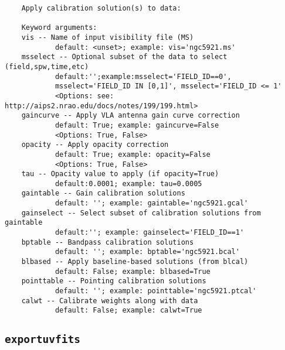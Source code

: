 \small
\begin{verbatim}
    Apply calibration solution(s) to data:
    
    Keyword arguments:
    vis -- Name of input visibility file (MS)
            default: <unset>; example: vis='ngc5921.ms'
    msselect -- Optional subset of the data to select (field,spw,time,etc)
            default:'';example:msselect='FIELD_ID==0', 
            msselect='FIELD_ID IN [0,1]', msselect='FIELD_ID <= 1'
            <Options: see: http://aips2.nrao.edu/docs/notes/199/199.html>
    gaincurve -- Apply VLA antenna gain curve correction
            default: True; example: gaincurve=False
            <Options: True, False>
    opacity -- Apply opacity correction
            default: True; example: opacity=False
            <Options: True, False>
    tau -- Opacity value to apply (if opacity=True)
            default:0.0001; example: tau=0.0005
    gaintable -- Gain calibration solutions
            default: ''; example: gaintable='ngc5921.gcal'
    gainselect -- Select subset of calibration solutions from gaintable
            default:''; example: gainselect='FIELD_ID==1'
    bptable -- Bandpass calibration solutions
            default: ''; example: bptable='ngc5921.bcal'
    blbased -- Apply baseline-based solutions (from blcal)
            default: False; example: blbased=True
    pointtable -- Pointing calibration solutions
            default: ''; example: pointtable='ngc5921.ptcal'
    calwt -- Calibrate weights along with data
            default: False; example: calwt=True
\end{verbatim}
\normalsize


\subsection{{\tt exportuvfits}}
\label{section:tasks.exportuvfits}

